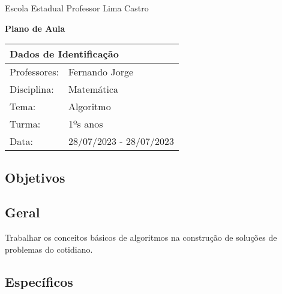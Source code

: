 \documentclass[oneside,a4paper,12pt]{article}
\newcommand{\universidade}{Escola Estadual Professor Lima Castro}
\newcommand{\professores}{Fernando Jorge}
\newcommand{\disciplina}{Matemática}
\newcommand{\tema}{Algoritmo}
\newcommand{\turma}{1ºs anos}
\newcommand{\data}{28/07/2023 - 28/07/2023}
\begin{document}
  \pagestyle{empty}

	\begin{center}

	  \universidade
	  \par
	  \vspace{10pt}
	  \LARGE \textbf{Plano de Aula}

	\end{center}

  \vspace{10pt}

	\begin{tabular}{ |l|p{12cm}| }

	  \hline
	  \multicolumn{2}{|l|}{\textbf{Dados de Identificação}} \\
	  \hline
	  Professores:         &    \professores           \\
	  \hline
	  Disciplina:        &    \disciplina          \\
	  \hline
	  Tema:              &    \tema                \\
	  \hline
	  Turma:             &    \turma               \\
	  \hline
	  Data:              &    \data                \\
	  \hline

	\end{tabular}

  \begin{snugshade}
  \section{Objetivos} %
  \end{snugshade}

  \subsection{Geral} %

  Trabalhar os conceitos básicos de algoritmos na construção de soluções de problemas do cotidiano.

  \subsection{Específicos} %
\end{document}
